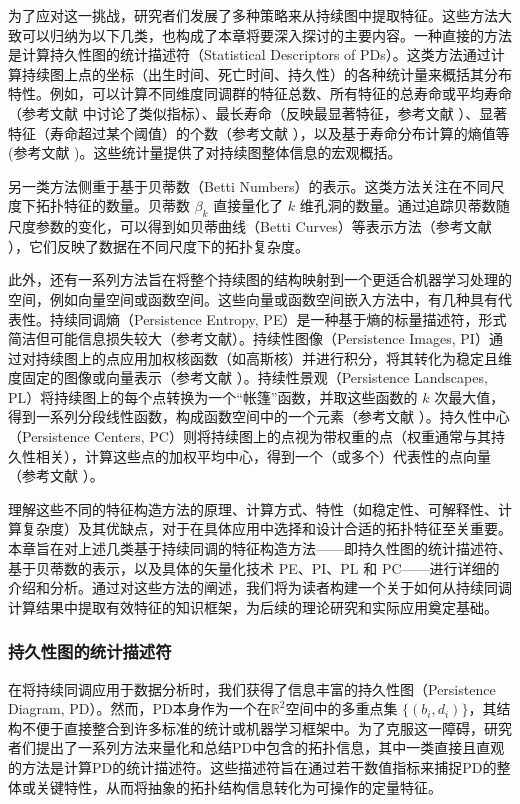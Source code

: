 为了应对这一挑战，研究者们发展了多种策略来从持续图中提取特征。这些方法大致可以归纳为以下几类，也构成了本章将要深入探讨的主要内容。一种直接的方法是计算持久性图的统计描述符（Statistical Descriptors of PDs）。这类方法通过计算持续图上点的坐标（出生时间、死亡时间、持久性）的各种统计量来概括其分布特性。例如，可以计算不同维度同调群的特征总数、所有特征的总寿命或平均寿命（参考文献  中讨论了类似指标）、最长寿命（反映最显著特征，参考文献 ）、显著特征（寿命超过某个阈值）的个数（参考文献 ），以及基于寿命分布计算的熵值等 (参考文献 )。这些统计量提供了对持续图整体信息的宏观概括。

另一类方法侧重于基于贝蒂数（Betti Numbers）的表示。这类方法关注在不同尺度下拓扑特征的数量。贝蒂数 $\beta_k$ 直接量化了 $k$ 维孔洞的数量。通过追踪贝蒂数随尺度参数的变化，可以得到如贝蒂曲线（Betti Curves）等表示方法（参考文献 ），它们反映了数据在不同尺度下的拓扑复杂度。

此外，还有一系列方法旨在将整个持续图的结构映射到一个更适合机器学习处理的空间，例如向量空间或函数空间。这些向量或函数空间嵌入方法中，有几种具有代表性。持续同调熵（Persistence Entropy, PE）是一种基于熵的标量描述符，形式简洁但可能信息损失较大（参考文献）。持续性图像（Persistence Images, PI）通过对持续图上的点应用加权核函数（如高斯核）并进行积分，将其转化为稳定且维度固定的图像或向量表示（参考文献 ）。持续性景观（Persistence Landscapes, PL）将持续图上的每个点转换为一个“帐篷”函数，并取这些函数的 $k$ 次最大值，得到一系列分段线性函数，构成函数空间中的一个元素（参考文献 ）。持久性中心（Persistence Centers, PC）则将持续图上的点视为带权重的点（权重通常与其持久性相关），计算这些点的加权平均中心，得到一个（或多个）代表性的点向量（参考文献 ）。

理解这些不同的特征构造方法的原理、计算方式、特性（如稳定性、可解释性、计算复杂度）及其优缺点，对于在具体应用中选择和设计合适的拓扑特征至关重要。本章旨在对上述几类基于持续同调的特征构造方法——即持久性图的统计描述符、基于贝蒂数的表示，以及具体的矢量化技术 PE、PI、PL 和 PC——进行详细的介绍和分析。通过对这些方法的阐述，我们将为读者构建一个关于如何从持续同调计算结果中提取有效特征的知识框架，为后续的理论研究和实际应用奠定基础。

        \subsubsection{持久性图的统计描述符}
            \label{sec:pd_stats}
            在将持续同调应用于数据分析时，我们获得了信息丰富的持久性图（Persistence Diagram, PD）。然而，PD本身作为一个在$\mathbb{R}^2$空间中的多重点集 $\{(b_i, d_i)\}$，其结构不便于直接整合到许多标准的统计或机器学习框架中。为了克服这一障碍，研究者们提出了一系列方法来量化和总结PD中包含的拓扑信息，其中一类直接且直观的方法是计算PD的统计描述符。这些描述符旨在通过若干数值指标来捕捉PD的整体或关键特性，从而将抽象的拓扑结构信息转化为可操作的定量特征。

